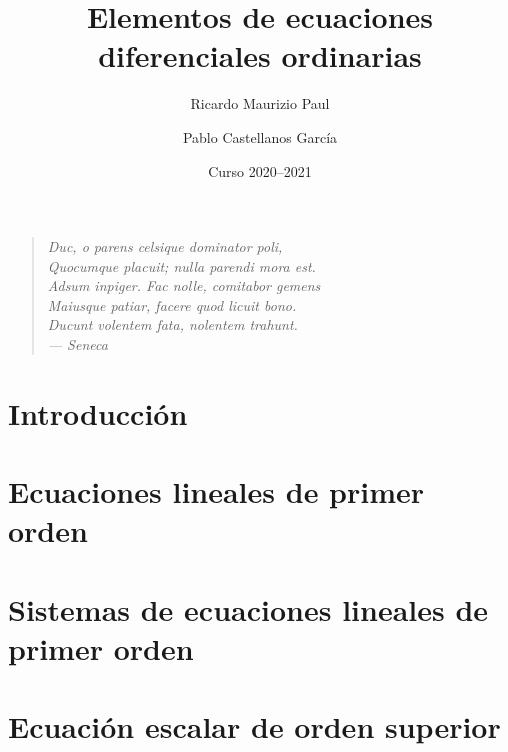 \documentclass[a4paper, 10pt, openany]{book}
\title{Elementos de ecuaciones diferenciales ordinarias}
\author{Ricardo Maurizio Paul \and Pablo Castellanos García}
\date{Curso 2020--2021}
\makeatletter
\renewcommand\mainmatter{
    \@mainmattertrue\cleardoublepage\renewcommand\thepage{\arabic{page}}}
\makeatother
\begin{document}
\frontmatter

\maketitle

\clearpage
\vspace*{\fill}
\thispagestyle{empty} %
\begin{quotation}
\raggedleft
\em %
Duc, o parens celsique dominator poli, \\
Quocumque placuit; nulla parendi mora est. \\
Adsum inpiger. Fac nolle, comitabor gemens \\
Maiusque patiar, facere quod licuit bono. \\
Ducunt volentem fata, nolentem trahunt. \\
\bigskip
--- Seneca
\end{quotation}
\vspace*{\fill}

\tableofcontents


\mainmatter

\chapter{Introducción}



\chapter{Ecuaciones lineales de primer orden}
\label{CHAP:1}


\chapter{Sistemas de ecuaciones lineales de primer orden}
\label{CHAP:2}


\chapter{Ecuación escalar de orden superior}
\label{CHAP:3}

\end{document}
